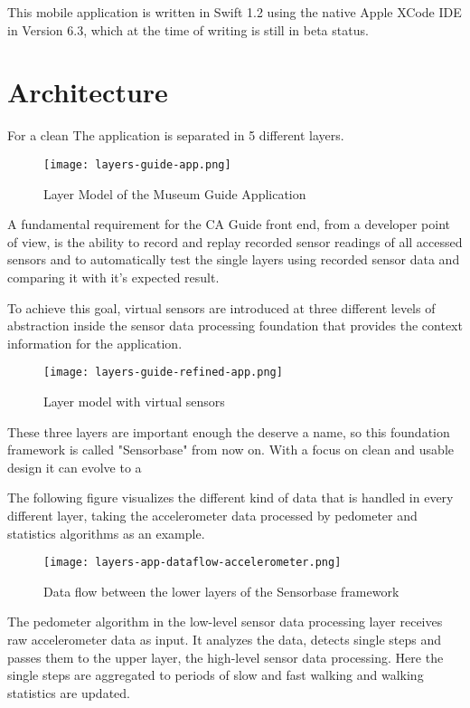 This mobile application is written in Swift 1.2 using the native Apple XCode IDE in Version 6.3, which at the time of writing is still in beta status.

\section{Architecture}

For a clean The application is separated in 5 different layers.

\begin{figure}[H]
\centering
\texttt{[image: layers-guide-app.png]}
\caption{Layer Model of the Museum Guide Application}
\end{figure}

A fundamental requirement for the CA Guide front end, from a developer point of view, is the ability to record and replay recorded sensor readings of all accessed sensors and to automatically test the single layers using recorded sensor data and comparing it with it's expected result.

To achieve this goal, virtual sensors are introduced at three different levels of abstraction inside the sensor data processing foundation that provides the context information for the application.
 
\begin{figure}[H]
\centering
\texttt{[image: layers-guide-refined-app.png]}
\caption{Layer model with virtual sensors}
\end{figure}

These three layers are important enough the deserve a name, so this foundation framework is called "Sensorbase" from now on. With a focus on clean and usable design it can evolve to a 

The following figure visualizes the different kind of data that is handled in every different layer, taking the accelerometer data processed by pedometer and statistics algorithms as an example. 

\begin{figure}[H]
\centering
\texttt{[image: layers-app-dataflow-accelerometer.png]}
\caption{Data flow between the lower layers of the Sensorbase framework}
\end{figure}

The pedometer algorithm in the low-level sensor data processing layer receives raw accelerometer data as input. It analyzes the data, detects single steps and passes them to the upper layer, the high-level sensor data processing. Here the single steps are aggregated to periods of slow and fast walking and walking statistics are updated.

